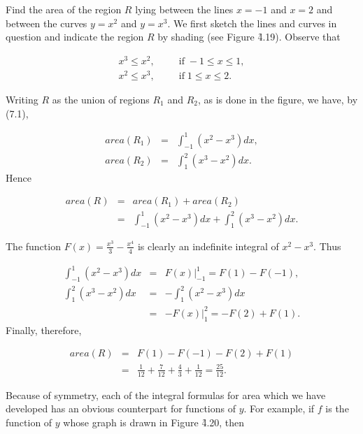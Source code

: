 \begin{example}
Find the area of the region $R$ lying between the lines $x = - 1$ and $x = 2$ and between the curves $y = x^2$ and $y = x^3$. We first sketch the
lines and curves in question and indicate the region $R$ by shading (see Figure \f{4.19}). Observe that

\begin{eqnarray*}
x^3 \leq x^2, &&\;\;\;\mbox{if}\; - 1 \leq x \leq 1,\\
x^2 \leq x^3, &&\;\;\;\mbox{if}\; 1 \leq x \leq 2.
\end{eqnarray*}

\noindent Writing $R$ as the union of regions $R_1$ and $R_2$, as is done in the figure, we have, by (7.1),

\begin{eqnarray*}
area(R_1) &=& \int_{-1}^{1} (x^2 - x^3) dx, \\
area(R_2) &=& \int_{1}^{2} (x^3 - x^2) dx.
\end{eqnarray*}
\noindent Hence 

\begin{eqnarray*}
area(R) &=& area(R_1) + area(R_2)\\
             &=& \int_{-1}^{1} (x^2 - x^3) dx + \int_{1}^{2} (x^3 - x^2) dx.
\end{eqnarray*}

\noindent The function $F(x) =\frac{x^3}{3} - \frac{x^4}{4}$ is clearly an indefinite integral of $x^2 - x^3$.  Thus

\begin{eqnarray*}
\int_{-1}^{1} (x^2 - x^3)dx &=& F(x) \Big|_{-1}^{1}  = F(1) - F( - 1),\\
\int_{1}^{2} (x^3 - x^2) dx &=& - \int_{1}^{2} (x^2 - x^3)dx\\
                            &=& -F(x) \Big|_{1}^{2} = - F(2) + F(1).
\end{eqnarray*}
\noindent Finally, therefore, 

\begin{eqnarray*}
area(R) &=& F(1) - F( - 1) - F(2) + F(1)\\
        &=& \frac{1}{12} + \frac{7}{12} + \frac{4}{3} + \frac{1}{12} = \frac{25}{12}.
\end{eqnarray*}
\end{example}
\medskip

Because of symmetry, each of the integral formulas for area which we have developed has an obvious counterpart for functions of $y$. For example, if $f$ is the function of $y$ whose graph is drawn in Figure \f{4.20}, then

